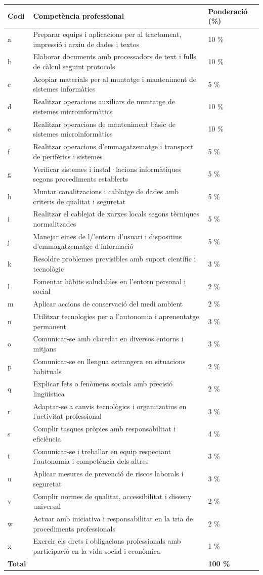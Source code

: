 \documentclass[
  paper=a4,
  ,captions=tableheading
]{scrartcl}
\begin{document}
\begin{longtable}[]{@{}lll@{}}
\toprule
\textbf{Codi} & \textbf{Competència professional} & \textbf{Ponderació
(\%)} \\
\midrule
\endhead
a & Preparar equips i aplicacions per al tractament, impressió i arxiu
de dades i textos & 10 \% \\
b & Elaborar documents amb processadors de text i fulls de càlcul
seguint protocols & 10 \% \\
c & Acopiar materials per al muntatge i manteniment de sistemes
informàtics & 5 \% \\
d & Realitzar operacions auxiliars de muntatge de sistemes
microinformàtics & 10 \% \\
e & Realitzar operacions de manteniment bàsic de sistemes
microinformàtics & 10 \% \\
f & Realitzar operacions d'emmagatzematge i transport de perifèrics i
sistemes & 5 \% \\
g & Verificar sistemes i instal·lacions informàtiques segons
procediments establerts & 5 \% \\
h & Muntar canalitzacions i cablatge de dades amb criteris de qualitat i
seguretat & 5 \% \\
i & Realitzar el cablejat de xarxes locals segons tècniques
normalitzades & 5 \% \\
j & Manejar eines de l/'entorn d'usuari i dispositius d'emmagatzematge
d'informació & 5 \% \\
k & Resoldre problemes previsibles amb suport científic i tecnològic & 3
\% \\
l & Fomentar hàbits saludables en l'entorn personal i social & 2 \% \\
m & Aplicar accions de conservació del medi ambient & 2 \% \\
n & Utilitzar tecnologies per a l'autonomia i aprenentatge permanent & 3
\% \\
o & Comunicar-se amb claredat en diversos entorns i mitjans & 3 \% \\
p & Comunicar-se en llengua estrangera en situacions habituals & 2 \% \\
q & Explicar fets o fenòmens socials amb precisió lingüística & 2 \% \\
r & Adaptar-se a canvis tecnològics i organitzatius en l'activitat
professional & 3 \% \\
s & Complir tasques pròpies amb responsabilitat i eficiència & 4 \% \\
t & Comunicar-se i treballar en equip respectant l'autonomia i
competència dels altres & 3 \% \\
u & Aplicar mesures de prevenció de riscos laborals i seguretat & 3
\% \\
v & Complir normes de qualitat, accessibilitat i disseny universal & 2
\% \\
w & Actuar amb iniciativa i responsabilitat en la tria de procediments
professionals & 2 \% \\
x & Exercir els drets i obligacions professionals amb participació en la
vida social i econòmica & 1 \% \\
\textbf{Total} & & \textbf{100 \%} \\
\bottomrule
\end{longtable}
\end{document}
